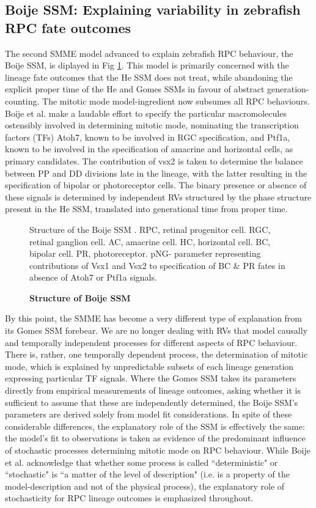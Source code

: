  \subsection{Boije SSM: Explaining variability in zebrafish RPC fate outcomes}
 
The second SMME model advanced to explain zebrafish RPC behaviour, the Boije SSM, is diplayed in Fig \ref{BoijeSSM}. This model is primarily concerned with the lineage fate outcomes that the He SSM does not treat, while abandoning the explicit proper time of the He and Gomes SSMs in favour of abstract generation-counting. The mitotic mode model-ingredient now subsumes all RPC behaviours. Boije et al. make a laudable effort to specify the particular macromolecules ostensibly involved in determining mitotic mode, nominating the transcription factors (TFs) Atoh7, known to be involved in RGC specification, and Ptf1a, known to be involved in the specification of amacrine and horizontal cells, as primary candidates. The contribution of vsx2 is taken to determine the balance between PP and DD divisions late in the lineage, with the latter resulting in the specification of bipolar or photoreceptor cells. The binary presence or absence of these signals is determined by independent RVs structured by the phase structure present in the He SSM, translated into generational time from proper time.

\begin{figure}[!h]
\caption{{\bf Structure of Boije SSM}}
Structure of the Boije SSM \cite{Boije2015}. RPC, retinal progenitor cell. RGC, retinal ganglion cell. AC, amacrine cell. HC, horizontal cell. BC, bipolar cell. PR, photoreceptor. pNG- parameter representing contributions of Vsx1 and Vsx2 to specification of BC \& PR fates in absence of Atoh7 or Ptf1a signals.
\label{BoijeSSM}
\end{figure}

By this point, the SMME has become a very different type of explanation from its Gomes SSM forebear. We are no longer dealing with RVs that model causally and temporally independent processes for different aspects of RPC behaviour. There is, rather, one temporally dependent process, the determination of mitotic mode, which is explained by unpredictable subsets of each lineage generation expressing particular TF signals. Where the Gomes SSM takes its parameters directly from empirical measurements of lineage outcomes, asking whether it is sufficient to assume that these are independently determined, the Boije SSM's parameters are derived solely from model fit considerations. In spite of these considerable differences, the explanatory role of the SSM is effectively the same: the model's fit to observations is taken as evidence of the predominant influence of stochastic processes determining mitotic mode on RPC behaviour. While Boije et al. acknowledge that whether some process is called ``deterministic" or ``stochastic" is ``a matter of the level of description" \cite{Boije2015} (i.e. is a property of the model-description and not of the physical process), the explanatory role of stochasticity for RPC lineage outcomes is emphasized throughout.
 
